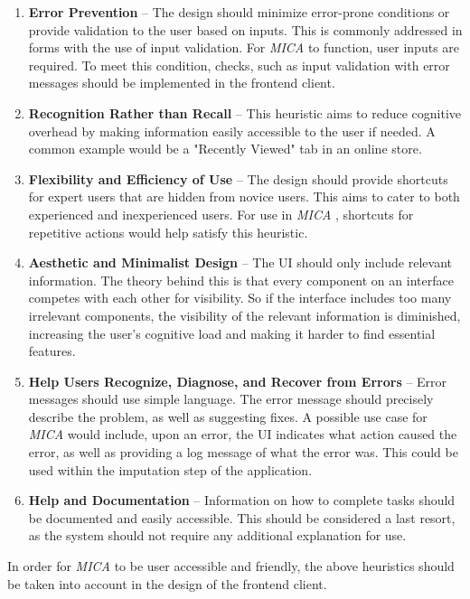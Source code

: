 \documentclass[a4paper, 11pt]{article}
\newcommand{\mica}{\textit{MICA }}
\begin{document}
\begin{enumerate}[label=\arabic*., wide=0pt, labelindent=0pt]
    \item \textbf{Error Prevention} -- The design should minimize error-prone
            conditions or provide validation to the user based on inputs. This
            is commonly addressed in forms with the use of input validation.
            For \mica to function, user inputs are required. To meet this
            condition, checks, such as input validation with error messages
            should be implemented in the frontend client.


    \item \textbf{Recognition Rather than Recall} -- This heuristic aims to
            reduce cognitive overhead by making information easily accessible
            to the user if needed. A common example would be a "Recently
            Viewed" tab in an online store. 

    \item \textbf{Flexibility and Efficiency of Use} -- The design should
            provide shortcuts for expert users that are hidden from novice
            users. This aims to cater to both experienced and inexperienced
            users. For use in \mica, shortcuts for repetitive actions would
            help satisfy this heuristic.

    \item \textbf{Aesthetic and Minimalist Design} -- The UI should only
            include relevant information. The theory behind this is that every
            component on an interface competes with each other for visibility.
            So if the interface includes too many irrelevant components, the
            visibility of the relevant information is diminished, increasing
            the user's cognitive load and making it harder to find essential
            features.

    \item \textbf{Help Users Recognize, Diagnose, and Recover from Errors} --
            Error messages should use simple language. The error message should
            precisely describe the problem, as well as suggesting fixes. A
            possible use case for \mica would include, upon an error, the UI
            indicates what action caused the error, as well as providing a log
            message of what the error was. This could be used within the
            imputation step of the application.

    \item \textbf{Help and Documentation} -- Information on how to complete
            tasks should be documented and easily accessible. This should be
            considered a last resort, as the system should not require any
            additional explanation for use. 

\end{enumerate}
In order for \mica to be user accessible and friendly, the above heuristics
should be taken into account in the design of the frontend client.
\end{document}
